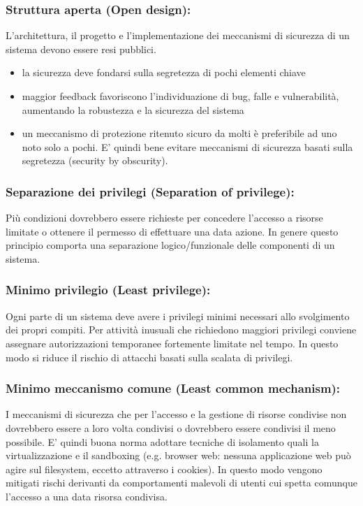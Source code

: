 \subsubsection{Struttura aperta (Open design):}  L’architettura, il progetto e l'implementazione dei meccanismi di sicurezza di un sistema devono essere resi pubblici.
\begin{itemize} 
  \item la sicurezza deve fondarsi sulla segretezza di pochi elementi chiave
  \item maggior feedback favoriscono l’individuazione di bug, falle e vulnerabilità, aumentando la robustezza e la sicurezza del sistema
  \item un meccanismo di protezione ritenuto sicuro da molti è preferibile ad uno noto solo a pochi. E' quindi bene evitare meccanismi di sicurezza basati sulla segretezza (security by obscurity).
\end{itemize}


\subsubsection{Separazione dei privilegi (Separation of privilege):} Più condizioni dovrebbero essere richieste per concedere l’accesso a risorse limitate o ottenere il permesso di effettuare una data azione. In genere questo principio comporta una separazione logico/funzionale delle componenti di un sistema.

\subsubsection{Minimo privilegio (Least privilege):} Ogni parte di un sistema deve avere i privilegi minimi necessari allo svolgimento dei propri compiti. Per attività inusuali che richiedono maggiori privilegi conviene assegnare autorizzazioni temporanee fortemente limitate nel tempo. In questo modo si riduce il rischio di attacchi basati sulla scalata di privilegi.

\subsubsection{Minimo meccanismo comune (Least common mechanism):} I meccanismi di sicurezza che per l’accesso e la gestione di risorse condivise non dovrebbero essere a loro volta condivisi o dovrebbero essere condivisi il meno possibile. E' quindi buona norma adottare tecniche di isolamento quali la virtualizzazione e il sandboxing (e.g. browser web: nessuna applicazione web può agire sul filesystem, eccetto attraverso i cookies). In questo modo vengono mitigati rischi derivanti da comportamenti malevoli di utenti cui spetta comunque l’accesso a una data risorsa condivisa.

